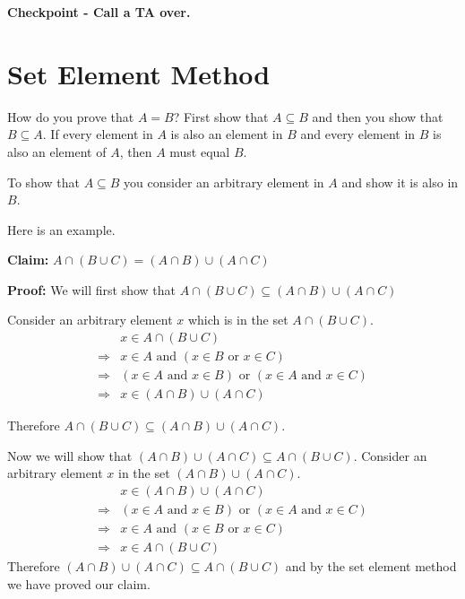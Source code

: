 \documentclass[12pt,letterpaper]{article}
\begin{document}
	\textbf{Checkpoint - Call a TA over.}

	\section*{Set Element Method}

	How do you prove that $A = B$? First show that $A \subseteq B$ and then you show that $B \subseteq A$. If every element in $A$ is also an element in $B$ and every element in $B$ is also an element of $A$, then $A$ must equal $B$. 

	To show that $A \subseteq B$ you consider an arbitrary element in $A$ and show it is also in $B$. 

	Here is an example.

	\textbf{Claim:} $A \cap (B \cup C) = (A \cap B) \cup (A \cap C)$

	\textbf{Proof:} We will first show that $A \cap (B \cup C) \subseteq (A \cap B) \cup (A \cap C)$

	Consider an arbitrary element $x$ which is in the set $A \cap (B \cup C)$.
	\begin{align*}
		&x \in A \cap (B \cup C) \\
		\Rightarrow &x \in A \text{ and } \left( x \in B \text{ or } x \in C \right) \\
		\Rightarrow & \left( x \in A \text{ and } x \in B \right) \text{ or } \left( x \in A \text{ and } x \in C\right)\\
		\Rightarrow & x\in (A \cap B) \cup (A \cap C)
	\end{align*}

	Therefore  $A \cap (B \cup C) \subseteq (A \cap B) \cup (A \cap C)$.

	Now we will show that  $ (A \cap B) \cup (A \cap C) \subseteq A \cap (B \cup C)$. Consider an arbitrary element $x$ in the set $(A \cap B) \cup (A \cap C)$.
	\begin{align*}
		&x \in (A \cap B) \cup (A \cap C) \\
		\Rightarrow &  \left( x \in A \text{ and } x \in B \right) \text{ or } \left( x \in A \text{ and } x \in C\right)\\
		\Rightarrow & x \in A \text{ and } \left( x \in B \text{ or } x \in C \right) \\
\Rightarrow  & x \in A \cap (B \cup C)
	\end{align*}
	Therefore $ (A \cap B) \cup (A \cap C) \subseteq A \cap (B \cup C)$ and by the set element method we have proved our claim.
\end{document}
